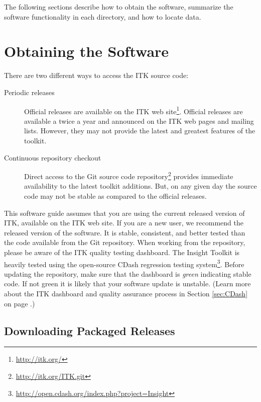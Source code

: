 The following sections describe how to obtain the software, summarize the
software functionality in each directory, and how to locate data.

\section{Obtaining the Software}
\label{sec:ObtainingTheSoftware}
\label{sec:DownloadingITK}

There are two different ways to access the ITK source code:
\begin{description}
  \item[Periodic releases]{Official releases are available on the ITK web
    site\footnote{\url{http://itk.org/}}. Official releases are available
    a twice a year and announced on the ITK web pages and mailing lists.
    However, they may not provide the latest and greatest features of the
    toolkit.}
  \item[Continuous repository checkout]{Direct access to the Git source code
    repository\footnote{\url{http://itk.org/ITK.git}} provides immediate
    availability to the latest toolkit additions. But, on any given day the
    source code may not be stable as compared to the official releases.}
\end{description}

This software guide assumes that you are using the current released version of
ITK, available on the ITK web site. If you are a new user, we recommend the
released version of the software. It is stable, consistent, and better tested
than the code available from the Git repository.  When working from the
repository, please be aware of the ITK quality testing dashboard.  The Insight
Toolkit is heavily tested using the open-source CDash regression testing
system\footnote{\url{http://open.cdash.org/index.php?project=Insight}}.  Before
updating the repository, make sure that the dashboard is \emph{green}
indicating stable code. If not green it is likely that your software update is
unstable. (Learn more about the ITK dashboard and quality assurance process in
Section \ref{sec:CDash} on page \pageref{sec:CDash}.)

\subsection{Downloading Packaged Releases}
\label{sec:DownloadingReleases}


